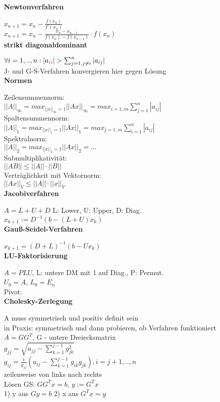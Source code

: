 \documentclass[10pt,twocolumn,a4paper]{article}
\begin{document}
\begin{flushleft}
\textbf{Newtonverfahren}

$x_{n+1} = x_n - \frac{f(x_n)}{f'(x_n)}$\\
$x_{n+1} = x_n - \frac{x_n - x_{n-1}}{f(x_n) - f(x_{n-1})} \cdot f(x_n)$\\

\textbf{strikt diagonaldominant}

$\forall i = 1,..,n: |a_{\textcolor{red}{ii}}| > \sum_{j=1,j\neq i}^n |a_{ij}|$\\
J- und G-S-Verfahren konvergieren hier gegen Lösung\\

\textbf{Normen}

Zeilensummennorm:\\
$||A||_\infty = max_{||x||_\infty=1}||Ax||_\infty=max_{i=1..m}\sum_{j=1}^n |a_{ij}|$\\
Spaltensummennorm:\\
$||A||_1 = max_{||x||_1=1}||Ax||_1=max_{j=1..m}\sum_{i=1}^n |a_{ij}|$\\
Spektralnorm:\\
$||A||_2 = max_{||x||_2=1}||Ax||_2=...$\\
Submultiplikativität:\\
$||AB|| \leq ||A|| \cdot ||B||$\\
Verträglichkeit mit Vektornorm:\\
$||Ax||_V \leq ||A|| \cdot ||x||_V$\\


\textbf{Jacobiverfahren}

$A = L + U + D$ L: Lower, U: Upper, D: Diag.\\
$x_{k+1} := D^{-1}(b-(L+U)x_k)$\\

\textbf{Gauß-Seidel-Verfahren}

$x_{k+1} = (D+L)^{-1} (b-Ux_k)$\\

\textbf{LU-Faktorisierung}

$A = PLU$, L: untere DM mit 1 auf Diag., P: Permut.\\
$U_0 = A$, $L_0 = E_n$\\
Pivot: \\

\textbf{Cholesky-Zerlegung}

A muss symmetrisch und positiv definit sein\\
in Praxis: symmetrisch und dann probieren, ob Verfahren funktioniert\\
$A = GG^T$, G - untere Dreiecksmatrix\\
$g_{jj} = \sqrt{a_{jj} - \sum_{k=1}^{j-1} g_{jk}^2}$\\
$g_{ij} = \frac{1}{g_{jj}} (a_{ij} - \sum_{k=1}^{j-1} g_{ik}g_{jk}), i=j+1,..,n$\\
zeilenweise von links nach rechts\\
Lösen GS: $GG^Tx=b$, $y:=G^Tx$\\
1) y aus $Gy=b$ 2) x aus $G^Tx=y$\\


\end{flushleft}
\end{document}

